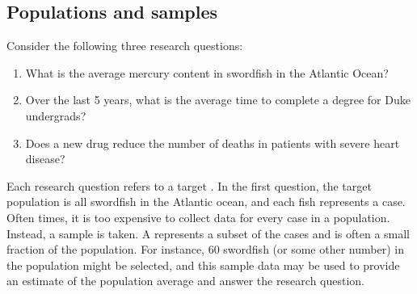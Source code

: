 
\subsection{Populations and samples}
\label{populationsAndSamples}

\noindent Consider the following three research questions:
\begin{enumerate}
\setlength{\itemsep}{0mm}
\item What is the average mercury content in swordfish in the Atlantic Ocean?
\item\label{timeToGraduationQuestionForUCLAStudents} Over the last 5 years, what is the average time to complete a degree for Duke undergrads?
\item\label{identifyPopulationOfStentStudy} Does a new drug reduce the number of deaths in patients with severe heart disease?
\end{enumerate}
Each research question refers to a target . In the first question, the target population is all swordfish in the Atlantic ocean, and each fish represents a case. Often times, it is too expensive to collect data for every case in a population. Instead, a sample is taken. A  represents a subset of the cases and is often a small fraction of the population. For instance, 60 swordfish (or some other number) in the population might be selected, and this sample data may be used to provide an estimate of the population average and answer the research question.

